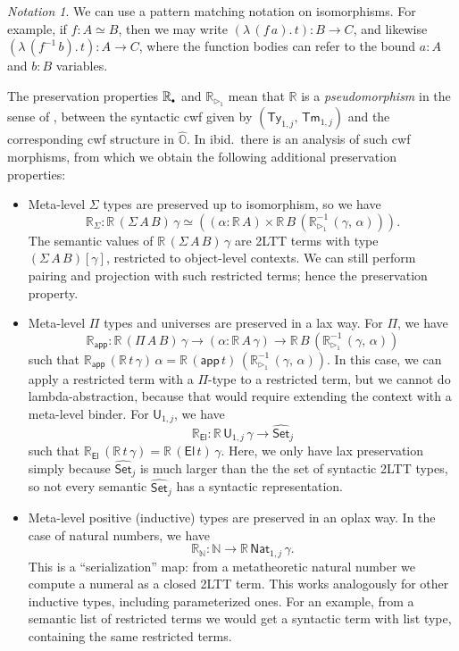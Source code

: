 \documentclass[acmsmall,anonymous,review]{acmart}
\newcommand{\msf}[1]{\mathsf{#1}}
\newcommand{\mbb}[1]{\mathbb{#1}}
\newcommand{\wh}[1]{\widehat{#1}}
\newcommand{\ext}{\triangleright}
\newcommand{\El}{\msf{El}}
\newcommand{\app}{\msf{app}}
\newcommand{\mbbo}{\mbb{O}}
\renewcommand{\U}{\msf{U}}
\newcommand{\Ty}{\msf{Ty}}
\newcommand{\Tm}{\msf{Tm}}
\newcommand{\Nat}{\msf{Nat}}
\newcommand{\emptycon}{\scaleobj{.75}\bullet}
\newcommand{\Set}{\mathsf{Set}}
\newcommand{\hato}{\bm\hat{\mbbo}}
\newcommand{\re}{\mbb{R}}
\theoremstyle{remark}
\newtheorem{notation}{Notation}
\newcommand{\whset}{\wh{\Set}}
\newcommand{\rexti}{\re_{\ext_1}^{-1}}
\begin{document}
\begin{notation}
  We can use a pattern matching notation on isomorphisms. For example, if $f : A
  \simeq B$, then we may write $(\lambda\,(f\,a).\,t) : B \to C$, and likewise
  $(\lambda\,(f^{-1}\,b).\,t) : A \to C$, where the function bodies can refer to
  the bound $a : A$ and $b : B$ variables.
\end{notation}

The preservation properties $\re_{\emptycon}$ and $\re_{\ext_1}$ mean that $\re$
is a \emph{pseudomorphism} in the sense of \cite{gluing}, between the syntactic
cwf given by $(\Ty_{1,j},\,\Tm_{1,j})$ and the corresponding cwf structure in
$\hato$. In ibid.\ there is an analysis of such cwf morphisms, from which we
obtain the following additional preservation properties:
\begin{itemize}
\item Meta-level $\Sigma$ types are preserved up to isomorphism, so we have
  \[ \re_{\Sigma} : \re\,(\Sigma\,A\,B)\,\gamma
  \simeq ((\alpha : \re\,A) \times \re\,B\,(\rexti\,(\gamma,\,\alpha))). \]
  The semantic values of $\re\,(\Sigma\,A\,B)\,\gamma$
  are 2LTT terms with type $(\Sigma\,A\,B)[\gamma]$, restricted to object-level contexts.
  We can still perform pairing and projection with such restricted terms; hence
  the preservation property.
\item Meta-level $\Pi$ types and universes are preserved in a lax way. For $\Pi$, we have
  \[ \re_{\app} : \re\,(\Pi\,A\,B)\,\gamma \to (\alpha : \re\,A\,\gamma) \to \re\,B\,(\rexti\,(\gamma,\,\alpha))
  \]
  such that $\re_{\app}\,(\re\,t\,\gamma)\,\alpha =
  \re\,(\app\,t)\,(\rexti\,(\gamma,\,\alpha))$. In this case, we can apply a
  restricted term with a $\Pi$-type to a restricted term, but we cannot do
  lambda-abstraction, because that would require extending the context with a
  meta-level binder. For $\U_{1,j}$, we have
  \[
    \re_{\El} : \re\,\U_{1,j}\,\gamma \to \whset_j
  \]
  such that $\re_{\El}\,(\re\,t\,\gamma) = \re\,(\El\,t)\,\gamma$. Here, we only
  have lax preservation simply because $\whset_j$ is much larger than the the
  set of syntactic 2LTT types, so not every semantic $\whset_j$ has a syntactic
  representation.

\item Meta-level positive (inductive) types are preserved in an oplax way. In the case of
  natural numbers, we have
  \[ \re_{\mbb{N}} : \mbb{N} \to \re\,\Nat_{1,j}\,\gamma. \]
  This is a ``serialization'' map: from a metatheoretic natural number we
  compute a numeral as a closed 2LTT term. This works analogously for other
  inductive types, including parameterized ones. For an example, from a semantic
  list of restricted terms we would get a syntactic term with list type,
  containing the same restricted terms.
\end{itemize}
\end{document}
